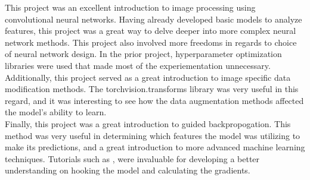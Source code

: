\documentclass{article}[12pt]
\begin{document}
This project was an excellent introduction to image processing using convolutional neural networks. Having already developed basic models to analyze features, this project was a great way to delve deeper into more complex neural network methods. This project also involved more freedoms in regards to choice of neural network design. In the prior project, hyperparameter optimization libraries were used that made most of the experiementation unnecessary.\\
\indent
Additionally, this project served as a great introduction to image specific data modification methods. The torchvision.transforms library \cite{transforms} was very useful in this regard, and it was interesting to see how the data augmentation methods affected the model's ability to learn.\\
\indent
Finally, this project was a great introduction to guided backpropogation. This method was very useful in determining which features the model was utilizing to make its predictions, and a great introduction to more advanced machine learning techniques. Tutorials such as \cite{saliency}, \cite{backprop} were invaluable for developing a better understanding on hooking the model and calculating the gradients.\\



\end{document}
